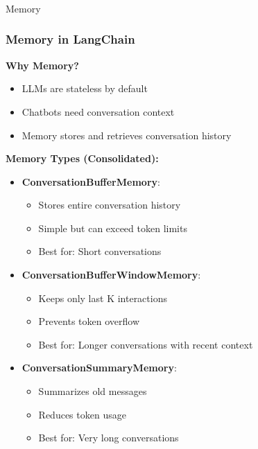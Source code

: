\begin{frame}[fragile]\frametitle{}
\begin{center}
{\Large Memory}
\end{center}
\end{frame}

\begin{frame}\frametitle{Memory in LangChain}

\textbf{Why Memory?}
\begin{itemize}
\item LLMs are stateless by default
\item Chatbots need conversation context
\item Memory stores and retrieves conversation history
\end{itemize}

\textbf{Memory Types (Consolidated):}
\begin{itemize}
\item \textbf{ConversationBufferMemory}:
    \begin{itemize}
    \item Stores entire conversation history
    \item Simple but can exceed token limits
    \item Best for: Short conversations
    \end{itemize}

\item \textbf{ConversationBufferWindowMemory}:
    \begin{itemize}
    \item Keeps only last K interactions
    \item Prevents token overflow
    \item Best for: Longer conversations with recent context
    \end{itemize}

\item \textbf{ConversationSummaryMemory}:
    \begin{itemize}
    \item Summarizes old messages
    \item Reduces token usage
    \item Best for: Very long conversations
    \end{itemize}
\end{itemize}

\end{frame}

